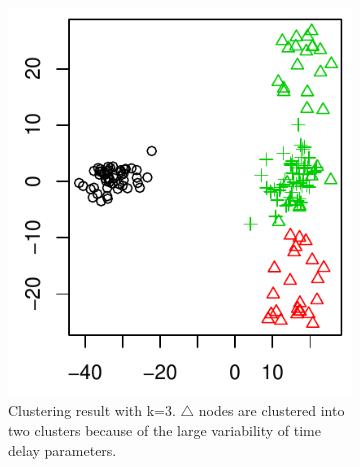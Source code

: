 \begin{figure}[H]
\begin{minipage}{0.5\textwidth}
\begin{subfigure}{\textwidth}
\includegraphics[width=\textwidth]{../simulation/plots/case2_exactclus_res}
\caption{Clustering result with k=3. $\triangle$ nodes are clustered into two clusters because of the large variability of time delay parameters.}
\end{subfigure}
\end{minipage}
\begin{minipage}{0.49\textwidth}
\begin{subfigure}{\textwidth}

\end{subfigure}
\end{minipage}
\end{figure}
